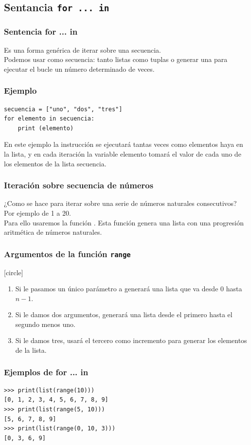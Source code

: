 \subsection{Sentancia \texttt{for ... in}}
\begin{frame}\frametitle{Sentencia for ... in}
Es una forma genérica de iterar sobre una secuencia.
\\
\bigskip
Podemos usar como secuencia: tanto listas como tuplas o generar una para ejecutar el bucle un número determinado de veces.
\end{frame}
\begin{frame}[fragile]
\frametitle{Ejemplo}
\begin{lstlisting}[basicstyle=\linespread{1.2}\ttfamily\small, columns=fullflexible]
secuencia = ["uno", "dos", "tres"]
for elemento in secuencia:
    print (elemento)
\end{lstlisting}
\pause
En este ejemplo la instrucción  se ejecutará tantas veces como elementos haya en la lista, y en cada iteración la variable elemento tomará el valor de cada uno de los elementos de la lista secuencia.
\end{frame}
\begin{frame}
\frametitle{Iteración sobre secuencia de números}
¿Como se hace para iterar sobre una serie de números naturales consecutivos?
\\
\bigskip
Por ejemplo de 1 a 20.
\\
\bigskip
\pause
 Para ello usaremos la función . Esta función genera una lista con una progresión aritmética de números naturales.
 \end{frame}
\begin{frame}
\frametitle{Argumentos de la función \texttt{range}}
[circle]
\begin{enumerate}[<+->]
\item Si le pasamos un único parámetro a generará una lista que va desde $0$ hasta $n-1$. 
\item Si le damos dos argumentos, generará una lista desde el primero hasta el segundo menos uno.
\item Si le damos tres, usará el tercero como incremento para generar los elementos de la lista.
\end{enumerate}  
\end{frame}
\begin{frame}[fragile]
\frametitle{Ejemplos de for ... in}
\begin{lstlisting}[numbers=none, basicstyle=\linespread{1.2}\ttfamily\small, columns=fullflexible]
>>> print(list(range(10)))
[0, 1, 2, 3, 4, 5, 6, 7, 8, 9]
>>> print(list(range(5, 10)))
[5, 6, 7, 8, 9]
>>> print(list(range(0, 10, 3)))
[0, 3, 6, 9]
\end{lstlisting}
\end{frame}
